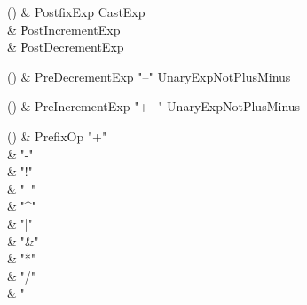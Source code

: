 \begin{bbgrammarappendix}

() & PostfixExp \label{prod:PostfixExp}  \: CastExp  \\

 &    \| PostIncrementExp \\
 &    \| PostDecrementExp \\

\end{bbgrammarappendix}

\begin{bbgrammarappendix}

() & PreDecrementExp \label{prod:PreDecrementExp}  \: \xcd"--" UnaryExpNotPlusMinus  \\


\end{bbgrammarappendix}

\begin{bbgrammarappendix}

() & PreIncrementExp \label{prod:PreIncrementExp}  \: \xcd"++" UnaryExpNotPlusMinus  \\


\end{bbgrammarappendix}

\begin{bbgrammarappendix}

() & PrefixOp \label{prod:PrefixOp}  \: \xcd"+"  \\

 &    \| \xcd"-" \\
 &    \| \xcd"!" \\
 &    \| \xcd"~" \\
 &    \| \xcd"^" \\
 &    \| \xcd"|" \\
 &    \| \xcd"&" \\
 &    \| \xcd"*" \\
 &    \| \xcd"/" \\
 &    \| \xcd"%

\end{bbgrammarappendix}

